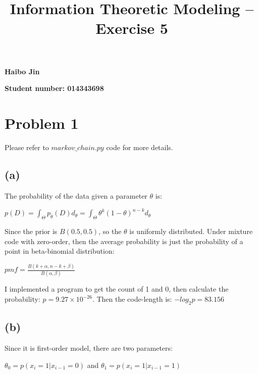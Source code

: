 \documentclass{article}
\title{Information Theoretic Modeling -- Exercise 5}
\date{}
\begin{document}
\maketitle

{\centering \large \textbf{Haibo Jin}}

{\centering \large \textbf{Student number: 014343698}}

\section{Problem 1}

Please refer to \emph{$markov\_chain.py$} code for more details.

\subsection*{(a)}

The probability of the data given a parameter $\theta$ is:

\vspace{2mm}

$p(D)=\int_{\Theta}p_{\theta}(D)d_{\theta}=\int_{\Theta}\theta^k(1-\theta)^{n-k}d_\theta$

\vspace{2mm}

Since the prior is $B(0.5,0.5)$, so the $\theta$ is uniformly distributed. Under mixture code with zero-order, then the average probability is just the probability of a point in beta-binomial distribution:

\vspace{2mm}

$pmf=\frac{B(k+\alpha, n-k+\beta)}{B(\alpha, \beta)}$

\vspace{2mm}

I implemented a program to get the count of 1 and 0, then calculate the probability: $p=9.27\times10^{-26}$. Then the code-length is: $-log_2p=83.156$

\subsection*{(b)}

Since it is first-order model, there are two parameters:

\vspace{2mm}

$\theta_0=p(x_i=1|x_{i-1}=0)$ and $\theta_1=p(x_i=1|x_{i-1}=1)$

\vspace{2mm}
\end{document}
